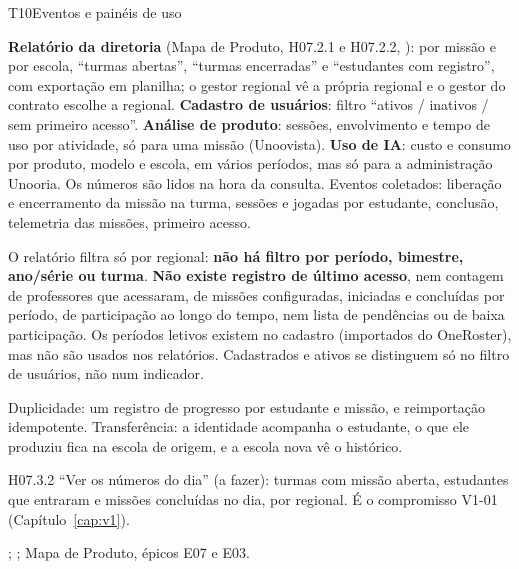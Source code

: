 \begin{resposta}{T10}{Eventos e painéis de uso}{\parcial}
\begin{campos}
  \item[Hoje] \textbf{Relatório da diretoria} (Mapa de Produto, H07.2.1 e
    H07.2.2, ): por missão e por escola, ``turmas abertas'',
    ``turmas encerradas'' e ``estudantes com registro'', com exportação em
    planilha; o gestor regional vê a própria regional e o gestor do contrato
    escolhe a regional. \textbf{Cadastro de usuários}: filtro ``ativos /
    inativos / sem primeiro acesso''. \textbf{Análise de produto}: sessões,
    envolvimento e tempo de uso por atividade, só para uma missão
    (Unoovista). \textbf{Uso de IA}: custo e consumo por produto, modelo e
    escola, em vários períodos, mas só para a administração Unooria. Os
    números são lidos na hora da consulta. Eventos coletados: liberação e
    encerramento da missão na turma, sessões e jogadas por estudante,
    conclusão, telemetria das missões, primeiro acesso.
  \item[Limitações] O relatório filtra só por regional: \textbf{não há filtro
    por período, bimestre, ano/série ou turma}. \textbf{Não existe registro de
    último acesso}, nem contagem de professores que acessaram, de missões
    configuradas, iniciadas e concluídas por período, de participação ao
    longo do tempo, nem lista de pendências ou de baixa participação. Os
    períodos letivos existem no cadastro (importados do OneRoster), mas não
    são usados nos relatórios. Cadastrados e ativos se distinguem só no
    filtro de usuários, não num indicador.
  \item[Tratamento] Duplicidade: um registro de progresso por estudante e
    missão, e reimportação idempotente. Transferência: a identidade acompanha
    o estudante, o que ele produziu fica na escola de origem, e a escola nova
    vê o histórico.
  \item[Planejado] H07.3.2 ``Ver os números do dia'' (a fazer): turmas com
    missão aberta, estudantes que entraram e missões concluídas no dia, por
    regional. É o compromisso V1-01 (Capítulo~\ref{cap:v1}).
  \item[Evidência] ;
    ; Mapa de Produto,
    épicos E07 e E03.
\end{campos}
\end{resposta}

